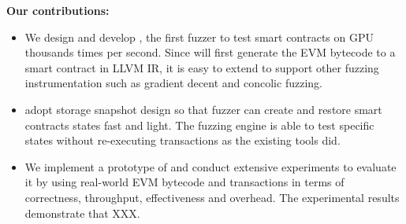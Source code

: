 \noindent\textbf{Our contributions:}
\begin{itemize}
    \item We design and develop {\tool}, the first fuzzer to test smart contracts on GPU thousands times per second.
    Since {\tool} will first generate the EVM bytecode to a smart contract in LLVM IR, it is easy to extend {\tool} to support other fuzzing instrumentation such as gradient decent\cite{angora_sp} and concolic fuzzing\cite{symcc_sec}.
    \item {\tool} adopt storage snapshot design so that fuzzer can create and restore smart contracts states fast and light. The fuzzing engine is able to test specific states without re-executing transactions as the existing tools did.
    \item We implement a prototype of {\tool} and conduct extensive experiments to evaluate it by using real-world EVM bytecode and transactions in terms of correctness, throughput, effectiveness and overhead.
    The experimental results demonstrate that XXX.
\end{itemize}




 